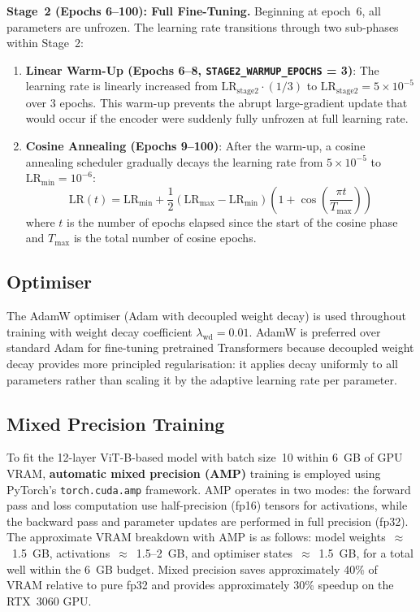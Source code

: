 \textbf{Stage~2 (Epochs 6--100): Full Fine-Tuning.}
Beginning at epoch~6, all parameters are unfrozen. The learning rate transitions through
two sub-phases within Stage~2:

\begin{enumerate}
    \item \textbf{Linear Warm-Up (Epochs 6--8, \texttt{STAGE2\_WARMUP\_EPOCHS} = 3)}:
          The learning rate is linearly increased from
          $\text{LR}_{\text{stage2}} \cdot (1/3)$ to
          $\text{LR}_{\text{stage2}} = 5 \times 10^{-5}$ over 3 epochs. This warm-up
          prevents the abrupt large-gradient update that would occur if the encoder
          were suddenly fully unfrozen at full learning rate.
    \item \textbf{Cosine Annealing (Epochs 9--100)}: After the warm-up, a cosine
          annealing scheduler gradually decays the learning rate from
          $5 \times 10^{-5}$ to $\text{LR}_{\min} = 10^{-6}$:
          \begin{equation}
              \text{LR}(t) = \text{LR}_{\min} + \frac{1}{2}
              (\text{LR}_{\max} - \text{LR}_{\min})
              \left(1 + \cos\!\left(\frac{\pi t}{T_{\max}}\right)\right)
          \end{equation}
          where $t$ is the number of epochs elapsed since the start of the cosine phase
          and $T_{\max}$ is the total number of cosine epochs.
\end{enumerate}

\subsection{Optimiser}

The AdamW optimiser (Adam with decoupled weight decay) is used throughout training with
weight decay coefficient $\lambda_{\text{wd}} = 0.01$. AdamW is preferred over standard
Adam for fine-tuning pretrained Transformers because decoupled weight decay provides
more principled regularisation: it applies decay uniformly to all parameters rather than
scaling it by the adaptive learning rate per parameter.

\subsection{Mixed Precision Training}

To fit the 12-layer ViT-B-based model with batch size~10 within 6~GB of GPU VRAM,
\textbf{automatic mixed precision (AMP)} training is employed using PyTorch's
\texttt{torch.cuda.amp} framework. AMP operates in two modes: the forward pass and loss
computation use half-precision (fp16) tensors for activations, while the backward pass
and parameter updates are performed in full precision (fp32). The approximate VRAM
breakdown with AMP is as follows:
model weights~$\approx$~1.5~GB, activations~$\approx$~1.5--2~GB, and optimiser
states~$\approx$~1.5~GB, for a total well within the 6~GB budget.
Mixed precision saves approximately 40\% of VRAM relative to pure fp32 and provides
approximately 30\% speedup on the RTX~3060 GPU.

